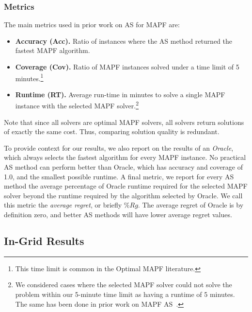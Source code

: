 \documentclass[letterpaper]{article} %
\begin{document}
\subsubsection{Metrics}
The main metrics used in prior work on AS for MAPF are:
\begin{itemize}
    \item \textbf{Accuracy (Acc).} Ratio of instances where the AS method returned the fastest MAPF algorithm.
    \item \textbf{Coverage (Cov).} Ratio of MAPF instances solved under a time limit of 5 minutes.\footnote{This time limit is common in the Optimal MAPF literature.}
    \item \textbf{Runtime (RT).} Average run-time in minutes to solve a single MAPF instance with the selected MAPF solver.\footnote{We considered cases where the selected MAPF solver could not solve the problem within our 5-minute time limit as having a runtime of 5 minutes. The same has been done in prior work on MAPF AS~\cite{kaduri2020algorithm,ren2021mapfast}.}
\end{itemize}
Note that since all solvers are optimal MAPF solvers, all solvers return solutions of exactly the same cost. Thus, comparing solution quality is redundant.

To provide context for our results, we also report on the results of an \emph{Oracle}, which always selects the fastest algorithm for every MAPF instance. No practical AS method can perform better than Oracle, which has accuracy and coverage of 1.0, and the smallest possible runtime.
A final metric, we report for every AS method the average percentage of Oracle runtime required for the selected MAPF solver beyond the runtime required by the algorithm selected by Oracle. We call this metric the \emph{average regret}, or briefly $\%Rg$.
The average regret of Oracle is by definition zero, and better AS methods will have lower average regret values.



\subsection{In-Grid Results}
\end{document}
